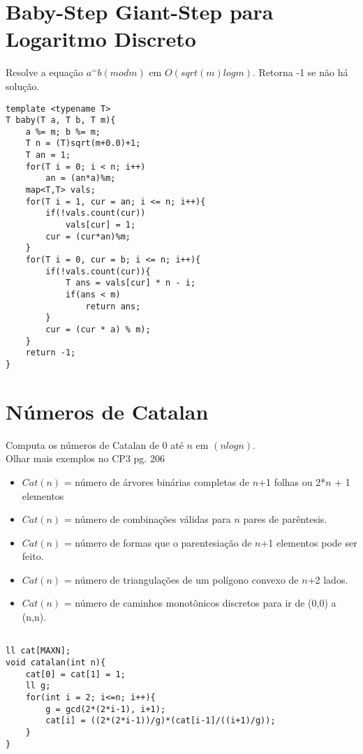 \section{Baby-Step Giant-Step para Logaritmo Discreto}
Resolve a equação $a^ = b(modm)$ em $O(sqrt(m)log m)$. Retorna -1 se não há solução.
\begin{multicols}{2}
\begin{lstlisting}
template <typename T>
T baby(T a, T b, T m){
	a %= m; b %= m;
	T n = (T)sqrt(m+0.0)+1;
	T an = 1;
	for(T i = 0; i < n; i++)
		an = (an*a)%m;
	map<T,T> vals;
	for(T i = 1, cur = an; i <= n; i++){
		if(!vals.count(cur))
			vals[cur] = 1;
		cur = (cur*an)%m;
	}
	for(T i = 0, cur = b; i <= n; i++){
		if(!vals.count(cur)){
			T ans = vals[cur] * n - i;
			if(ans < m)
				return ans;
		}
		cur = (cur * a) % m);
	}
	return -1;
}

\end{lstlisting}
\end{multicols}

\section{Números de Catalan}
Computa os números de Catalan de 0 até $n$ em $(nlogn)$.\\
Olhar mais exemplos no CP3 pg. 206
\begin{itemize}
\itemsep0em
\item $Cat(n)$ = número de árvores binárias completas de $n$+1 folhas ou 2*$n$ + 1 elementos
\item $Cat(n)$ = número de combinações válidas para $n$ pares de parêntesis.
\item $Cat(n)$ = número de formas que o parentesiação de $n$+1 elementos pode ser feito.
\item $Cat(n)$ = número de triangulações de um polígono convexo de $n$+2 lados.
\item $Cat(n)$ = número de caminhos monotônicos discretos para ir de (0,0) a (n,n).
\end{itemize}

\begin{multicols}{2}
\begin{lstlisting}

ll cat[MAXN];
void catalan(int n){
	cat[0] = cat[1] = 1;
	ll g;
	for(int i = 2; i<=n; i++){
		g = gcd(2*(2*i-1), i+1);
		cat[i] = ((2*(2*i-1))/g)*(cat[i-1]/((i+1)/g));
	}
}	

\end{lstlisting}
\end{multicols}

